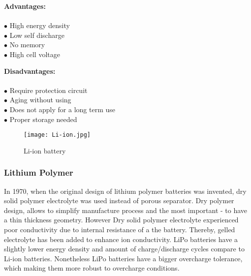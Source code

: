 \begin{multicols}{2}
	
	\textbf{Advantages:} \\ \\
	$\bullet$ High energy density\\
	$\bullet$ Low self discharge\\
	$\bullet$ No memory\\
	$\bullet$ High cell voltage\\
	
	
	
	
	\columnbreak
	
	\textbf{Disadvantages:} \\ \\
	$\bullet$ Require protection circuit\\
	$\bullet$ Aging without using\\
	$\bullet$ Does not apply for a long term use\\
	$\bullet$ Proper storage needed 

	
	
\end{multicols}


\begin{figure}[h]
	\centering
	\texttt{[image: Li-ion.jpg]}
	\caption{ Li-ion battery \cite{11}}
	\label{fig: EPS}
\end{figure}

\subsubsection{Lithium Polymer \label{sec:tech}}

In 1970, when the original design of lithium polymer batteries was invented, dry solid polymer electrolyte was used instead of  porous separator. Dry polymer design, allows to simplify manufacture process and the most important - to have a thin thickness geometry. However Dry solid polymer electrolyte experienced poor conductivity due to internal resistance of a the battery. Thereby, gelled electrolyte has been added to enhance ion conductivity. LiPo batteries have a slightly lower energy density and amount of charge/discharge cycles compare to Li-ion batteries. Nonetheless LiPo batteries have a bigger overcharge tolerance, which making them more robust to overcharge conditions.


